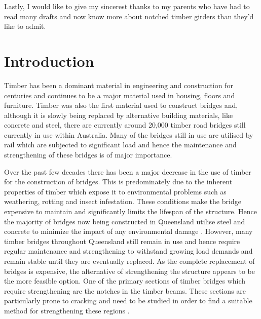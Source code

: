 \documentclass[11pt,a4paper]{article}
\numberwithin{equation}{subsection}
\DeclareRobustCommand\nocite[1]{%
	{\def\cite##1{\ignorespaces}#1}}
\begin{document}
\vspace*{\baselineskip}

\noindent
Lastly, I would like to give my sincerest thanks to my parents who have had to read many drafts and now know more about notched timber girders than they'd like to admit.

\pagebreak

	\tableofcontents
	\vspace*{\baselineskip}
	\vspace*{\baselineskip}
	
	\pagebreak

	\nocite\listoffigures 
	\nocite\listoftables
	\pagebreak
	
	\section{Introduction}
	
	\setcounter{page}{1}

	
	\noindent
	Timber has been a dominant material in engineering and construction for centuries and continues to be a major material used in housing, floors and furniture. Timber was also the first material used to construct bridges and, although it is slowly being replaced by alternative building materials, like concrete and steel, there are currently around 20,000 timber road bridges still currently in use within Australia\cite{_timber_2005}. Many of the bridges still in use are utilised by rail which are subjected to significant load and hence the maintenance and strengthening of these bridges is of major importance\cite{wilkinson_capacity_2008}. 
    
    \vspace*{\baselineskip}
    
    \noindent
    Over the past few decades there has been a major decrease in the use of timber for the construction of bridges. This is predominately due to the inherent properties of timber which expose it to environmental problems such as weathering, rotting and insect infestation\cite{_timber_2005,_section_2008}. These conditions make the bridge expensive to maintain and significantly limits the lifespan of the structure.  Hence the majority of bridges now being constructed in Queensland utilise steel and concrete to minimize the impact of any environmental damage \cite{ritter_timber_1990}. However, many timber bridges throughout Queensland still remain in use and hence require regular maintenance and strengthening to withstand growing load demands and remain stable until they are eventually replaced. As the complete replacement of bridges is expensive, the alternative of strengthening the structure appears to be the more feasible option. One of the primary sections of timber bridges which require strengthening are the notches in the timber beams. These sections are particularly prone to cracking and need to be studied in order to find a suitable method for strengthening these regions \cite{_timber_2005}.
	
\end{document}
